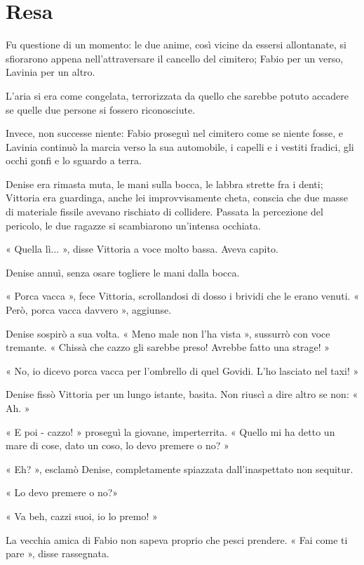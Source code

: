 \chapter{Resa}

Fu questione di un momento: le due anime, così vicine da essersi allontanate, si sfiorarono appena nell'attraversare il cancello del cimitero; Fabio per un verso, Lavinia per un altro. 

L'aria si era come congelata, terrorizzata da quello che sarebbe potuto accadere se quelle due persone si fossero riconosciute. 

Invece, non successe niente: Fabio proseguì nel cimitero come se niente fosse, e Lavinia continuò la marcia verso la sua automobile, i capelli e i vestiti fradici, gli occhi gonfi e lo sguardo a terra.

Denise era rimasta muta, le mani sulla bocca, le labbra strette fra i denti; Vittoria era guardinga, anche lei improvvisamente cheta, conscia che due masse di materiale fissile avevano rischiato di collidere. Passata la percezione del pericolo, le due ragazze si scambiarono un'intensa occhiata.

« Quella lì... », disse Vittoria a voce molto bassa. Aveva capito.

Denise annuì, senza osare togliere le mani dalla bocca.

« Porca vacca », fece Vittoria, scrollandosi di dosso i brividi che le erano venuti. « Però, porca vacca davvero », aggiunse.

Denise sospirò a sua volta. « Meno male non l'ha vista », sussurrò con voce tremante. « Chissà che cazzo gli sarebbe preso! Avrebbe fatto una strage! »

« No, io dicevo porca vacca per l'ombrello di quel Govidi. L'ho lasciato nel taxi! »

Denise fissò Vittoria per un lungo istante, basita. Non riuscì a dire altro se non: « Ah. »

« E poi - cazzo! » proseguì la giovane, imperterrita. « Quello mi ha detto un mare di cose,  dato un coso, lo devo premere o no? »

« Eh? », esclamò Denise, completamente spiazzata dall'inaspettato non sequitur.

« Lo devo premere o no?»

« Va beh, cazzi suoi, io lo premo! »

La vecchia amica di Fabio non sapeva proprio che pesci prendere. « Fai come ti pare », disse rassegnata.

